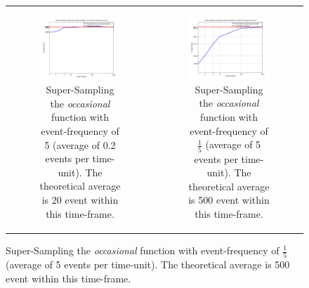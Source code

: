 \begin{figure}
\begin{center}
	\begin{tabular}{c c}
		\begin{subfigure}[b]{0.5\textwidth}
			\centering
			\includegraphics[width=.6\textwidth, angle=0]{./../shared/fig/sampling/samplingTest_occasionally_ss_02evts.png}
			\caption{Super-Sampling the \textit{occasional} function with event-frequency of 5 (average of 0.2 events per time-unit). The theoretical average is 20 event within this time-frame.}
			\label{fig:sampling_occasionally_ss_02evts}
		\end{subfigure}
	
		&
		
		\begin{subfigure}[b]{0.5\textwidth}
			\centering
			\includegraphics[width=.6\textwidth, angle=0]{./../shared/fig/sampling/samplingTest_occasionally_ss_5evts.png}
			\caption{Super-Sampling the \textit{occasional} function with event-frequency of $\frac{1}{5}$ (average of 5 events per time-unit). The theoretical average is 500 event within this time-frame.}
			\label{fig:sampling_occasionally_ss_5evts}
		\end{subfigure}

		\\
		

\end{tabular}
\end{center}
\end{figure}

